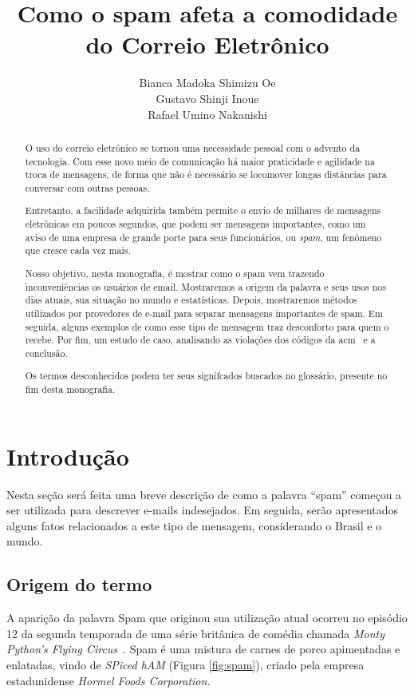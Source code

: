 \documentclass[a4paper,dvipdfm]{article}
\title{Como o spam afeta a comodidade do Correio Eletrônico}
\author{Bianca Madoka Shimizu Oe\\
		Gustavo Shinji Inoue\\
		Rafael Umino Nakanishi}
\begin{document}
\maketitle

\begin{abstract}
	O uso do correio eletrônico se tornou uma necessidade pessoal com o advento da tecnologia. Com esse novo meio de comunicação há maior praticidade e agilidade na troca de mensagens, de forma que não é necessário se locomover longas distâncias para conversar com outras pessoas.

	Entretanto, a facilidade adquirida também permite o envio de milhares de mensagens eletrônicas em poucos segundos, que podem ser mensagens importantes, como um aviso de uma empresa de grande porte para seus funcionários, ou \emph{spam}, um fenômeno que cresce cada vez mais.

	Nosso objetivo, nesta monografia, é mostrar como o spam vem trazendo inconveniências os usuários de \gls{email}.
	Mostraremos a origem da palavra e seus usos nos dias atuais, sua situação no mundo e estatísticas.
	Depois, mostraremos métodos utilizados por provedores de e-mail para separar mensagens importantes de spam.
	Em seguida, alguns exemplos de como esse tipo de mensagem traz desconforto para quem o recebe. 
	Por fim, um estudo de caso, analisando as violações dos códigos da \gls{acm}~\cite{ACM} e a conclusão.
	
	Os termos desconhecidos podem ter seus signifcados buscados no glossário, presente no fim desta monografia.
\end{abstract}

\newpage

\tableofcontents
\newpage


\section{Introdução}
	Nesta seção será feita uma breve descrição de como a palavra ``spam'' começou a ser utilizada para descrever e-mails indesejados.
	Em seguida, serão apresentados alguns fatos relacionados a este tipo de mensagem, considerando o Brasil e o mundo.

	\subsection{Origem do termo}
		A aparição da palavra Spam que originou sua utilização atual ocorreu no episódio 12 da segunda temporada de uma série britânica de comédia chamada \emph{Monty Python's Flying Circus}~\cite{montyPython:fc, mpyt}. 
		Spam é uma mistura de carnes de porco apimentadas e enlatadas, vindo de \emph{SPiced hAM} (Figura \ref{fig:spam}), criado pela empresa estadunidense \emph{Hormel Foods Corporation}.
\end{document}
